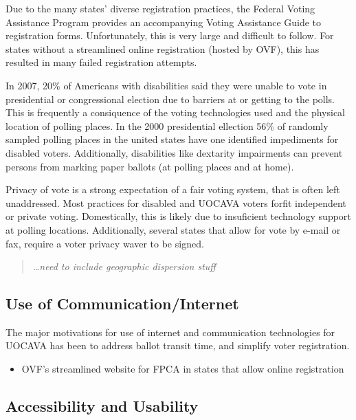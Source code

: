 Due to the many states' diverse registration practices, the Federal Voting Assistance Program provides an accompanying Voting Assistance Guide to registration forms. Unfortunately, this is very large and difficult to follow. For states without a streamlined online registration (hosted by OVF), this has resulted in many failed registration attempts.


In 2007, 20\% of Americans with disabilities said they were unable to vote in presidential or congressional election due to barriers at or getting to the polls. This is frequently a consiquence of the voting technologies used and the physical location of polling places. In the 2000 presidential ellection 56\% of randomly sampled polling places in the united states have one identified impediments for disabled voters. Additionally, disabilities like dextarity impairments can prevent persons from marking paper ballots (at polling places and at home).

Privacy of vote is a strong expectation of a fair voting system, that is often left unaddressed. Most practices for disabled and UOCAVA voters forfit independent or private voting. Domestically, this is likely due to insuficient technology support at polling locations. Additionally, several states that allow for vote by e-mail or fax, require a voter privacy waver to be signed.

\begin{quote} {\em \ldots need to include geographic dispersion stuff}\end{quote}

\subsection{Use of Communication/Internet}

The major motivations for use of internet and communication technologies for UOCAVA has been to address ballot transit time, and simplify voter registration. 
\begin{itemize}
\item OVF's streamlined website for FPCA in states that allow online registration
\end{itemize}

\subsection{Accessibility and Usability}
